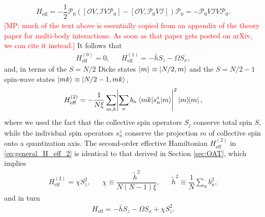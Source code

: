 \documentclass[aps,notitlepage,nofootinbib,11pt]{revtex4-1}
\renewcommand{\t}{\text} %
\newcommand{\f}[2]{\dfrac{#1}{#2}} %
\newcommand{\p}[1]{\left(#1\right)} %
\renewcommand{\sp}[1]{\left[#1\right]} %
\newcommand{\bk}{\braket} %
\newcommand{\I}{\mathcal{I}}
\renewcommand{\O}{\mathcal{O}}
\renewcommand{\P}{\mathcal{P}}
\newcommand{\1}{\hat{\mathds{1}}}
\newcommand{\note}[1]{\textcolor{red}{#1}}
\begin{document}
\begin{align}
  H_{\t{eff}}
  = -\f12 \P_0 \p{\sp{\O V, \I V \P_0} - \sp{\O V, \P_0 V \I}} \P_0
  = -\P_0 V \I V \P_0.
\end{align}
\note{[MP: much of the text above is essentially copied from an
  appendix of the theory paper for multi-body interactions.  As soon
  as that paper gets posted on arXiv, we can cite it instead.]}  It
follows that
\begin{align}
  H_{\t{eff}}^{(0)} = 0,
  &&
  H_{\t{eff}}^{(1)} = -\bar h S_z - \Omega S_x,
\end{align}
and, in terms of the $S=N/2$ Dicke states $\ket{m}\equiv\ket{N/2,m}$
and the $S=N/2-1$ spin-wave states $\ket{mk}\equiv\ket{N/2-1,mk}$,
\begin{align}
  H_{\t{eff}}^{(2)}
  = - \f1{N\xi} \sum_{m,k} \abs{\sum_nb_n\bk{mk|s_n^z|m}}^2 \op{m},
  \label{eq:general_H_eff_2}
\end{align}
where we used the fact that the collective spin operators $S_j$
conserve total spin $S$, while the individual spin operators $s_n^z$
conserve the projection $m$ of collective spin onto a quantization
axis.  The second-order effective Hamiltonian $H_{\t{eff}}^{(2)}$ in
\eqref{eq:general_H_eff_2} is identical to that derived in Section
\ref{sec:OAT}, which implies
\begin{align}
  H_{\t{eff}}^{(2)} = \chi S_z^2,
  &&
  \chi \equiv \f{\tilde h^2}{N\p{N-1}\xi},
  &&
  \tilde h^2 \equiv \f1N \sum_n b_n^2,
\end{align}
and in turn
\begin{align}
  H_{\t{eff}} = -\bar h S_z - \Omega S_x + \chi S_z^2.
\end{align}


\end{document}
